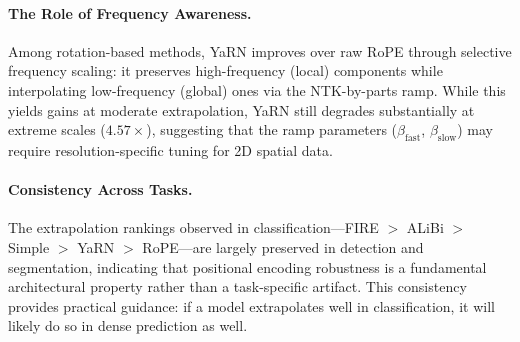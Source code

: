 \paragraph{The Role of Frequency Awareness.}
Among rotation-based methods, YaRN improves over raw RoPE through selective frequency scaling:
it preserves high-frequency (local) components while interpolating low-frequency (global) ones
via the NTK-by-parts ramp. While this yields gains at moderate extrapolation, YaRN still degrades
substantially at extreme scales ($4.57\times$), suggesting that the ramp parameters
($\beta_{\text{fast}}$, $\beta_{\text{slow}}$) may require resolution-specific tuning for 2D spatial data.

\paragraph{Consistency Across Tasks.}
The extrapolation rankings observed in classification---FIRE $>$ ALiBi $>$ Simple $>$
YaRN $>$ RoPE---are largely preserved in detection and segmentation, indicating that
positional encoding robustness is a fundamental architectural property rather than a task-specific
artifact. This consistency provides practical guidance: if a model extrapolates well in
classification, it will likely do so in dense prediction as well.